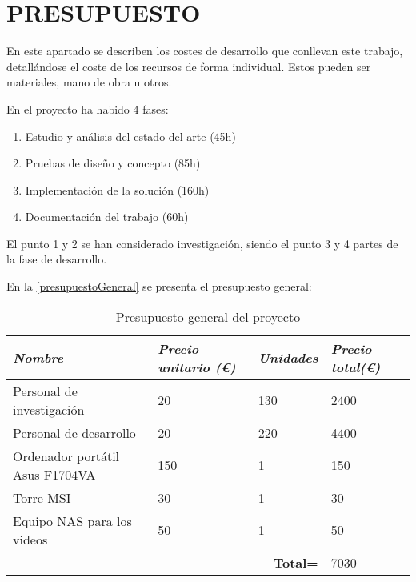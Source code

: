 \section{PRESUPUESTO}

En este apartado se describen los costes de desarrollo que conllevan este trabajo, detallándose el coste de los recursos de forma individual. Estos pueden ser materiales, mano de obra u otros.

En el proyecto ha habido 4 fases:
\begin{enumerate}
    \item Estudio y análisis del estado del arte (45h)
    \item Pruebas de diseño y concepto (85h)
    \item Implementación de la solución (160h)
    \item Documentación del trabajo (60h)
\end{enumerate}

El punto 1 y 2 se han considerado investigación, siendo el punto 3 y 4 partes de la fase de desarrollo.

En la \autoref{presupuestoGeneral} se presenta el presupuesto general:

\begin{table}[H]
    \begin{tabular}{|lll|l|}
    \hline
    \multicolumn{1}{|l|}{\textit{\textbf{Nombre}}} & \multicolumn{1}{l|}{\textit{\textbf{Precio unitario (€)}}} & \textit{\textbf{Unidades}} & \textit{\textbf{Precio total(€)}} \\ \hline
    \multicolumn{1}{|l|}{Personal de investigación}            & \multicolumn{1}{l|}{20}      & 130  & 2400               \\ \hline
    \multicolumn{1}{|l|}{Personal de desarrollo}               & \multicolumn{1}{l|}{20}      & 220  & 4400               \\ \hline
    \multicolumn{1}{|l|}{Ordenador portátil Asus F1704VA}      & \multicolumn{1}{l|}{150}     & 1    & 150                \\ \hline
    \multicolumn{1}{|l|}{Torre MSI}                            & \multicolumn{1}{l|}{30}      & 1    & 30                 \\ \hline
    \multicolumn{1}{|l|}{Equipo NAS para los videos}           & \multicolumn{1}{l|}{50}      & 1    & 50                 \\ \hline
    \multicolumn{3}{|r|}{\textbf{Total=}}                                                            & 7030               \\ \hline
    \end{tabular}
    \caption{Presupuesto general del proyecto}
    \label{presupuestoGeneral}
\end{table}

